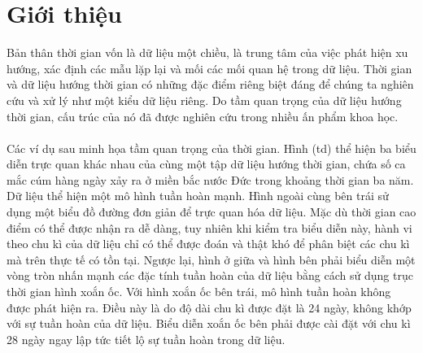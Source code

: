 \section{Giới thiệu}
Bản thân thời gian vốn là dữ liệu một chiều, là trung tâm của việc phát hiện xu hướng, xác định các mẫu lặp lại và mối các mối quan hệ trong dữ liệu. Thời gian và dữ liệu hướng thời gian có những đặc điểm riêng biệt đáng để chúng ta nghiên cứu và xử lý như một kiểu dữ liệu riêng. Do tầm quan trọng của dữ liệu hướng thời gian, cấu trúc của nó đã được nghiên cứu trong nhiều ấn phẩm khoa học. 
\\ \\
Các ví dụ sau minh họa tầm quan trọng của thời gian. Hình (td) thể hiện ba biểu diễn trực quan khác nhau của cùng một tập dữ liệu hướng thời gian, chứa số ca mắc cúm hàng ngày xảy ra ở miền bắc nước Đức trong khoảng thời gian ba năm. Dữ liệu thể hiện một mô hình tuần hoàn mạnh. Hình ngoài cùng bên trái sử dụng một biểu đồ đường đơn giản để trực quan hóa dữ liệu. Mặc dù thời gian cao điểm có thể được nhận ra dễ dàng, tuy nhiên khi kiểm tra biểu diễn này, hành vi theo chu kì của dữ liệu chỉ có thể được đoán và thật khó để phân biệt các chu kì mà trên thực tế có tồn tại. Ngược lại, hình ở giữa và hình bên phải biểu diễn một vòng tròn nhấn mạnh các đặc tính tuần hoàn của dữ liệu bằng cách sử dụng trục thời gian hình xoắn ốc. Với hình xoắn ốc bên trái, mô hình tuần hoàn không được phát hiện ra. Điều này là do độ dài chu kì được đặt là 24 ngày, không khớp với sự tuần hoàn của dữ liệu. Biểu diễn xoắn ốc bên phải được cài đặt với chu kì 28 ngày ngay lập tức tiết lộ sự tuần hoàn trong dữ liệu.